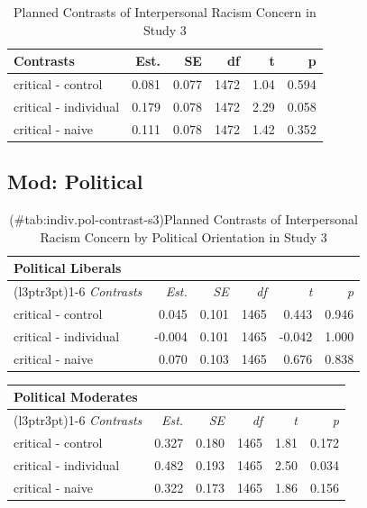 \documentclass[
]{book}
\begin{document}
\begin{table}

\caption{\label{tab:indiv-contrast-s3}Planned Contrasts of Interpersonal Racism Concern in Study 3}
\centering
\begin{tabular}[t]{lrrrrr}
\toprule
Contrasts & Est. & SE & df & t & p\\
\midrule
critical - control & 0.081 & 0.077 & 1472 & 1.04 & 0.594\\
critical - individual & 0.179 & 0.078 & 1472 & 2.29 & 0.058\\
critical - naive & 0.111 & 0.078 & 1472 & 1.42 & 0.352\\
\bottomrule
\end{tabular}
\end{table}

\hypertarget{mod-political-20}{%
\subsection{Mod: Political}\label{mod-political-20}}

\begin{table}

\caption{(\#tab:indiv.pol-contrast-s3)Planned Contrasts of Interpersonal Racism Concern by Political Orientation in Study 3}
\centering
\begin{tabular}[t]{lrrrrr}
\toprule
\multicolumn{6}{l}{Political Liberals} \\
\cmidrule(l{3pt}r{3pt}){1-6}
\em{Contrasts} & \em{Est.} & \em{SE} & \em{df} & \em{t} & \em{p}\\
\midrule
critical - control & 0.045 & 0.101 & 1465 & 0.443 & 0.946\\
critical - individual & -0.004 & 0.101 & 1465 & -0.042 & 1.000\\
critical - naive & 0.070 & 0.103 & 1465 & 0.676 & 0.838\\
\bottomrule
\end{tabular}
\end{table}

\begin{table}
\centering
\fontsize{13}{15}\selectfont
\begin{tabular}{lrrrrr}
\toprule
\multicolumn{6}{l}{Political Moderates} \\
\cmidrule(l{3pt}r{3pt}){1-6}
\em{Contrasts} & \em{Est.} & \em{SE} & \em{df} & \em{t} & \em{p}\\
\midrule
critical - control & 0.327 & 0.180 & 1465 & 1.81 & 0.172\\
critical - individual & 0.482 & 0.193 & 1465 & 2.50 & 0.034\\
critical - naive & 0.322 & 0.173 & 1465 & 1.86 & 0.156\\
\bottomrule
\end{tabular}
\end{table}
\end{document}
